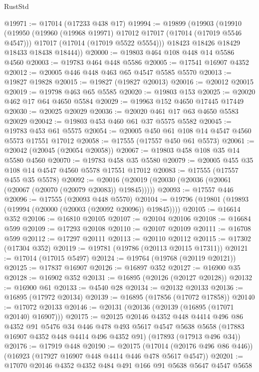 \begin{lexlean}{RustStd}
\begin{coremodule}
@19971 := @17014 (@17233 @438 @17)
@19994 := @19899
    (@19903
      (@19910
        (@19950
          (@19960 (@19968 @19971) @17012 @17017 (@17014 (@17019 @5546 @4547)))
          @17017
          (@17014 (@17019 @5522 @5554)))
        @18423
        @18426
        @18429
        @18433
        @18438
        @18444))
@20000 := @19803 @464 @108 @448 @14 @5586 @4560
@20003 := @19783 @464 @448 @5586
@20005 := @17541 @16907 @4352
@20012 := @20005 @446 @448 @463 @65 @4547 @5585 @5570
@20013 := @19827 @19828
@20015 := @19827 (@19827 @20013)
@20016 := @20012 @20015
@20019 := @19798 @463 @65 @5585
@20020 := @19803 @153
@20025 := @20020 @462 @17 @64 @4650 @5584
@20029 := @19963 @152 @4650 @17445 @17449
@20030 := @20025 @20029
@20036 := @20020 @461 @17 @63 @4650 @5583 @20029
@20042 := @19803 @453 @460 @61 @37 @5575 @5582
@20045 := @19783 @453 @61 @5575
@20054 := @20005 @450 @61 @108 @14 @4547 @4560 @5573 @17551 @17012
@20058 := @17555 (@17557 @450 @61 @5573)
@20061 := @20042 (@20045 (@20054 @20058))
@20067 := @19803 @458 @108 @35 @14 @5580 @4560
@20070 := @19783 @458 @35 @5580
@20079 := @20005 @455 @35 @108 @14 @4547 @4560 @5578 @17551 @17012
@20083 := @17555 (@17557 @455 @35 @5578)
@20092 := @20016 (@20019 (@20030 (@20036 (@20061 (@20067 (@20070 (@20079 @20083)) @19845)))))
@20093 := @17557 @446
@20096 := @17555 (@20093 @448 @5570)
@20104 := @19796 (@19801 (@19893 (@19994 (@20000 (@20003 (@20092 @20096)) @19845))))
@20105 := @16614 @352
@20106 := @16810 @20105
@20107 := @20104 @20106
@20108 := @16684 @599
@20109 := @17293 @20108
@20110 := @20107 @20109
@20111 := @16708 @599
@20112 := @17297 @20111
@20113 := @20110 @20112
@20115 := @17302 (@17304 @352)
@20119 := @19781 (@19786 (@20113 @20115 @17311))
@20121 := @17014 (@17015 @5497)
@20124 := @19764 (@19768 (@20119 @20121))
@20125 := @17837 @16907
@20126 := @16897 @352
@20127 := @16900 @35
@20128 := @16902 @352
@20131 := @16895 (@20126 (@20127 @20128))
@20132 := @16900 @61
@20133 := @4540 @28
@20134 := @20132 @20133
@20136 := @16895 (@17972 @20134)
@20139 := @16895 (@17856 (@17072 @17858))
@20140 := @17072 @20133
@20146 := @20131 (@20136 (@20139 (@16895 (@17071 @20140) @16907)))
@20175 := @20125
    @20146
    @4352
    @448
    @4414
    @496
    @86
    @4352
    @91
    @5476
    @34
    @446
    @478
    @493
    @5617
    @4547
    @5638
    @5658
    (@17883 @16907 @4352 @448 @4414 @496 @4352 @91)
    (@17893 (@17913 @496 @34))
@20176 := @17919 @448
@20190 := @20175
    (@17014 (@20176 @496 @86 @446))
    (@16923 (@17927 @16907 @448 @4414 @446 @478 @5617 @4547))
@20201 := @17070 @20146 @4352 @4352 @484 @491 @166 @91 @5638 @5647 @4547 @5658

\end{coremodule}
\end{lexlean}
